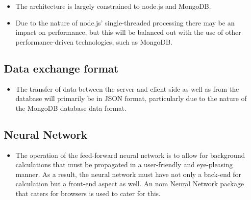 \begin{itemize}
	\item The architecture is largely constrained to node.js and MongoDB.
	\item Due to the nature of node.js' single-threaded processing there may be an impact on performance, but this will be balanced out with the use of other performance-driven technologies, such as MongoDB.
\end{itemize}

\subsection{Data exchange format}
\begin{itemize}
	\item The transfer of data between the server and client side as well as from the database will primarily be in JSON format, particularly due to the nature of the MongoDB database data format.
\end{itemize}

\subsection{Neural Network}
\begin{itemize}
	\item The operation of the feed-forward neural network is to allow for background calculations that must be propagated in a user-friendly and eye-pleasing manner. As a result, the neural network must have not only a back-end for calculation but a front-end aspect as well. An nom Neural Network package that caters for browsers is used to cater for this.
\end{itemize}